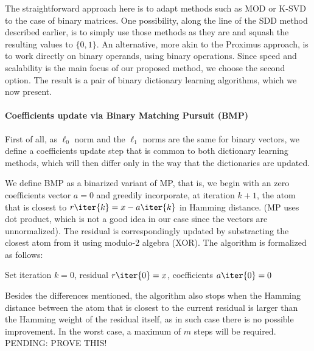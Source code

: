 \documentclass[a4paper]{IEEEtran}
\begin{document}
The straightforward approach here is to adapt methods such as MOD or K-SVD to the case of binary matrices. One possibility, along the line of the SDD method described earlier, is to simply use those methods as they are and squash the resulting values to $\{0,1\}$. An alternative, more akin to the Proximus approach, is to work directly on binary operands, using binary operations. Since speed and scalability is the main focus of our proposed method, we choose the second option. The result is a pair of binary dictionary learning algorithms, which we now present.

\paragraph{Coefficients update via Binary Matching Pursuit (BMP)}
First of all, as $\ell_0$ norm and the $\ell_1$ norms are the same for binary vectors, we define a coefficients update step that is common to both dictionary learning methods, which will then differ only in the way that the dictionaries are updated.

We define BMP as a binarized variant of MP, that is, we begin with an zero coefficients vector $a=0$ and greedily incorporate, at iteration $k+1$, the atom that is closest to  $r\iter{k} = x - a\iter{k}$ in Hamming distance. (MP uses dot product, which is not a good idea in our case since the vectors are unnormalized). %
The residual is correspondingly  updated by substracting the closest atom from it using modulo-2 algebra (XOR). The algorithm is formalized as follows:

\begin{algorithm}[ht]
Set iteration $k=0$, residual $r\iter{0}=x$, coefficients $a\iter{0}=0$\;
\label{alg:bmp}
\end{algorithm}

Besides the differences mentioned, the algorithm also stops when the Hamming distance between the atom that is closest to the current residual is larger than the Hamming weight of the residual itself, as in such case there is no possible improvement. %
In the worst case, a maximum of $m$ steps will be required.
PENDING: PROVE THIS!
 
\end{document}
